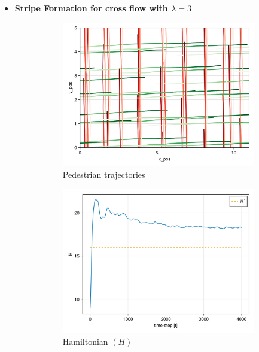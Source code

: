 \begin{itemize}
\pagebreak
    \item \textbf{Stripe Formation for cross flow with $\lambda = 3$}
    \begin{figure}[H]
        \centering
        \begin{subfigure}{\textwidth}
            \centering
            \includegraphics[width=0.6\linewidth]{figures/s0crossleap3flow_10000.png}
            \caption{Pedestrian trajectories}
            \label{plot:cross_traj}
        \end{subfigure}
        \begin{subfigure}{.40\textwidth}
            \centering
            \includegraphics[width=\linewidth]{figures/H_cross.png}
            \caption{Hamiltonian $(H)$}
            \label{plot:cross_h}
        \end{subfigure}
        \begin{subfigure}{.40\textwidth}
            \centering

\end{subfigure}
\end{figure}
\end{itemize}
